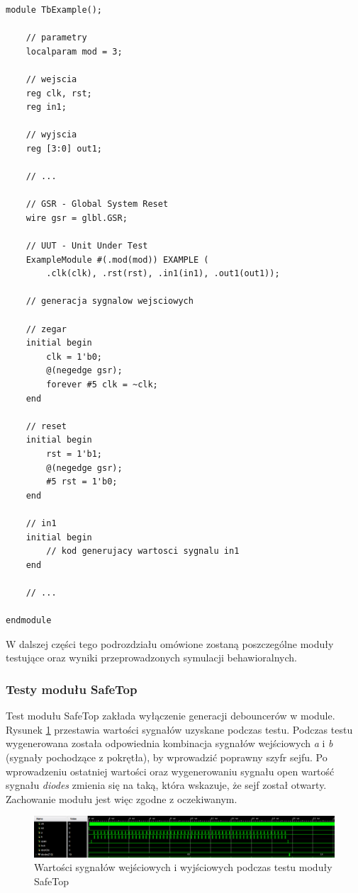 \documentclass[12pt] {article}
\begin{document}
\begin{lstlisting}[style={verilog-style}, caption={Uproszczona struktura wykonanych modułów testujących}, label={lst:testy}]
module TbExample();
    
    // parametry    
    localparam mod = 3;    
    
    // wejscia
    reg clk, rst;
    reg in1;
    
    // wyjscia
    reg [3:0] out1; 
    
    // ...

    // GSR - Global System Reset
    wire gsr = glbl.GSR;

    // UUT - Unit Under Test
    ExampleModule #(.mod(mod)) EXAMPLE (
        .clk(clk), .rst(rst), .in1(in1), .out1(out1));

    // generacja sygnalow wejsciowych

    // zegar
    initial begin
        clk = 1'b0;
        @(negedge gsr);
        forever #5 clk = ~clk;
    end
    
    // reset
    initial begin
        rst = 1'b1;
        @(negedge gsr);
        #5 rst = 1'b0;
    end
    
    // in1
    initial begin 
        // kod generujacy wartosci sygnalu in1
    end
    
    // ...
    
endmodule
\end{lstlisting}
W dalszej części tego podrozdziału omówione zostaną poszczególne moduły testujące oraz wyniki przeprowadzonych symulacji behawioralnych. 

\subsubsection{Testy modułu SafeTop}
Test modułu SafeTop zakłada wyłączenie generacji debouncerów w module. Rysunek \ref{fig:behavSafeTop} przestawia wartości sygnałów uzyskane podczas testu.  Podczas testu wygenerowana została odpowiednia kombinacja sygnałów wejściowych \textit{a} i \textit{b} (sygnały pochodzące z pokrętła), by wprowadzić poprawny szyfr sejfu. Po wprowadzeniu ostatniej wartości oraz wygenerowaniu sygnału open wartość sygnału \textit{diodes} zmienia się na taką, która wskazuje, że sejf został otwarty. Zachowanie modułu jest więc zgodne z oczekiwanym.
\begin{figure}[H]
\centering
\includegraphics[width=\textwidth]{res/behav_sims/SafeTop_behavSim_1.png}
\caption{Wartości sygnałów wejściowych i wyjściowych podczas testu moduły SafeTop}
\label{fig:behavSafeTop}
\end{figure}
\end{document}
